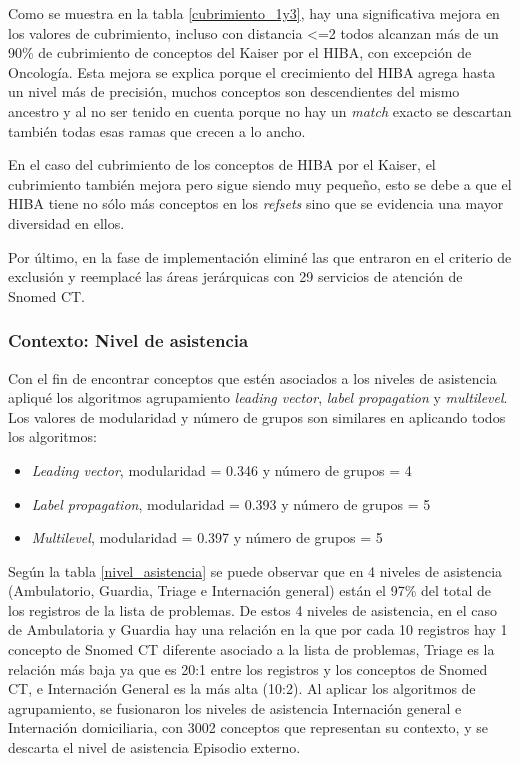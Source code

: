 Como se muestra en la tabla \ref{cubrimiento_1y3}, hay una significativa mejora en los valores de cubrimiento, incluso con distancia \textless=2 todos alcanzan más de un 90\% de cubrimiento de conceptos del Kaiser por el HIBA, con excepción de Oncología. Esta mejora se explica porque el crecimiento del HIBA agrega hasta un nivel más de precisión, muchos conceptos son descendientes del mismo ancestro y al no ser tenido en cuenta porque no hay un \textit{match} exacto se descartan también todas esas ramas que crecen a lo ancho.

En el caso del cubrimiento de los conceptos de HIBA por el Kaiser, el cubrimiento también mejora pero sigue siendo muy pequeño, esto se debe a que el HIBA tiene no sólo más conceptos en los \textit{refsets} sino que se evidencia una mayor diversidad en ellos.
 
Por último, en la fase de implementación eliminé las que entraron en el criterio de exclusión y reemplacé las áreas jerárquicas con 29 servicios de atención de Snomed CT.


\subsubsection{Contexto: Nivel de asistencia}
Con el fin de encontrar conceptos que estén asociados a los niveles de asistencia apliqué los algoritmos agrupamiento \textit{leading vector}, \textit{label propagation} y \textit{multilevel}. Los valores de modularidad y número de grupos son similares en aplicando todos los algoritmos:
\begin{itemize}
\item \textit{Leading vector}, modularidad = \num{0.346} y número de grupos = 4
\item \textit{Label propagation}, modularidad = \num{0.393} y número de grupos = 5
\item \textit{Multilevel}, modularidad = \num{0.397} y número de grupos = 5
\end{itemize}

Según la tabla \ref{nivel_asistencia} se puede observar que en 4 niveles de asistencia (Ambulatorio, Guardia, Triage e Internación general) están el 97\% del total de los registros de la lista de problemas. De estos 4 niveles de asistencia, en el caso de Ambulatoria y Guardia hay una relación en la que por cada 10 registros hay 1 concepto de Snomed CT diferente asociado a la lista de problemas, Triage es la relación más baja ya que es 20:1 entre los registros y los conceptos de Snomed  CT, e Internación General es la más alta (10:2). Al aplicar los algoritmos de agrupamiento, se fusionaron los niveles de asistencia Internación general e Internación domiciliaria, con 3002 conceptos que representan su contexto, y se descarta el nivel de asistencia Episodio externo.

